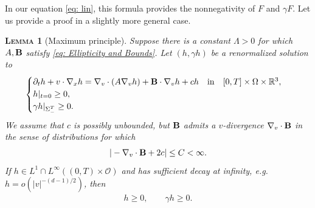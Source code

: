 \documentclass[10pt, reqno]{amsart}
\theoremstyle{plain}
\newtheorem{lemma}[theorem]{\normalfont \scshape Lemma}
\theoremstyle{definition}
\theoremstyle{remark}
\numberwithin{equation}{section}
\newcommand{\bfB}{{\bf B}}
\newcommand{\calO}{\mathcal O}
\newcommand{\p}{\partial}
\newcommand{\R}{\mathbb{R}}
\begin{document}
In our equation \eqref{eq: lin}, this formula provides the nonnegativity of $F$ and $\gamma F$. Let us provide a proof in a slightly more general case.


\begin{lemma}[Maximum principle] \label{lem: nonnegative}
    Suppose there is a constant $\Lambda>0$ for which $A,\bfB$ satisfy \eqref{eq: Ellipticity and Bounds}. Let $(h,\gamma h)$ be a renormalized solution to
    \begin{align*}
    \begin{cases}
        \p_t h + v\cdot \nabla_x h = \nabla_v \cdot (A\nabla_v h) + \bfB \cdot \nabla_v h + ch \quad \text{in}\quad [0,T]\times\Omega\times\R^3,\\
        h|_{t=0} \ge 0,\\
        \gamma h|_{\Sigma_-^T} \ge 0.
    \end{cases}
    \end{align*}
    We assume that $c$ is possibly unbounded, but $\bfB$ admits a $v$-divergence $\nabla_v\cdot \bfB$ in the sense of distributions for which
    \begin{align*}
        |-\nabla_v\cdot \bfB + 2c| \le C < \infty.
    \end{align*}
    If $h \in L^1\cap L^\infty((0,T)\times\calO)$ and has sufficient decay at infinity, \textit{e.g.} $h=o(|v|^{-(d-1)/2})$, then
    \begin{align*}
        h\ge 0, \qquad \gamma h \ge 0.
    \end{align*}
\end{lemma}
\end{document}
